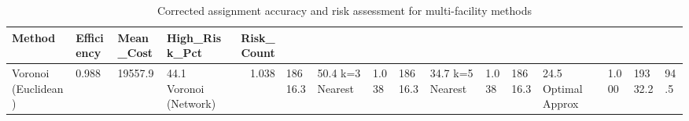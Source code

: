 \begin{table}
\caption{Corrected assignment accuracy and risk assessment for multi-facility methods}
\label{tab:multifacility_accuracy_corrected}
\begin{tabular}{llllr}
\toprule
Method & Efficiency & Mean_Cost & High_Risk_Pct & Risk_Count \\
\midrule
Voronoi (Euclidean) & 0.988 & 19557.9 & 44.1%
Voronoi (Network) & 1.038 & 18616.3 & 50.4%
k=3 Nearest & 1.038 & 18616.3 & 34.7%
k=5 Nearest & 1.038 & 18616.3 & 24.5%
Optimal Approx & 1.000 & 19332.2 & 94.5%
\bottomrule
\end{tabular}
\end{table}
